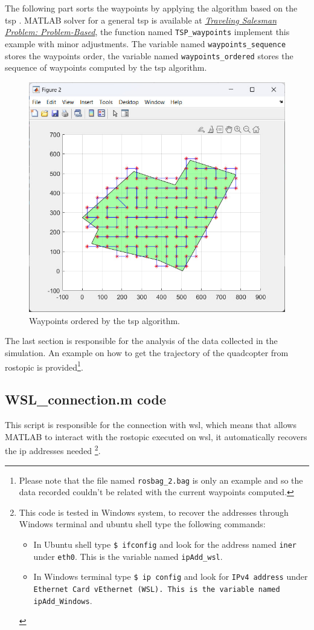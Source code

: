 The following part sorts the waypoints by applying the algorithm based on the \ac{tsp} \cite{tsp_wikipedia}. MATLAB solver for a general \ac{tsp} is available at \href{https://it.mathworks.com/help/optim/ug/traveling-salesman-problem-based.html}{\textit{Traveling Salesman Problem: Problem-Based}}, the function named \texttt{TSP\_waypoints} implement this example with minor adjustments. The variable named \texttt{waypoints\_sequence} stores the waypoints order, the variable named \texttt{waypoints\_ordered} stores the sequence of waypoints computed by the \ac{tsp} algorithm.

\begin{figure}[hbt!]
	\centering
	\includegraphics[width=.5\linewidth]{images/waypoints_ordered}
	\caption{Waypoints ordered by the \ac{tsp} algorithm.}
\end{figure}

The last section is responsible for the analysis of the data collected in the simulation. An example on how to get the trajectory of the quadcopter from rostopic is provided\footnote{Please note that the file named \texttt{rosbag\_2.bag} is only an example and so the data recorded couldn't be related with the current waypoints computed.}.

\subsection*{WSL\_connection.m code}
This script is responsible for the connection with \ac{wsl}, which means that allows MATLAB to interact with the rostopic executed on \ac{wsl}, it automatically recovers the ip addresses needed
\footnote{This code is tested in Windows system, to recover the addresses through Windows terminal and ubuntu shell type the following commands: 
\begin{itemize}
	\item In Ubuntu shell type \texttt{\$ ifconfig} and look for the address named \texttt{iner} under \texttt{eth0}. This is the variable named \texttt{ipAdd\_wsl}.
	\item In Windows terminal type \texttt{\$ ip config} and look for \texttt{IPv4 address} under \texttt{Ethernet Card vEthernet (WSL). This is the variable named \texttt{ipAdd\_Windows}}.
\end{itemize}}.


